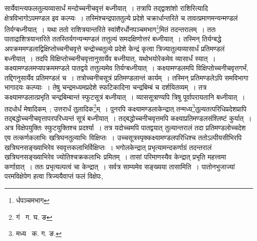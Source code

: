 \documentclass[11pt, openany]{book}
\begin{document}
\noindent सार्येवान्त्यफलतुल्यव्यासार्धं मन्दोच्चनीचवृत्तं बध्नीयात्~। तत्रापि तद्द्वाशांशो राशिरित्यादि क्षेत्रविभागोऽपमण्डल इव 
कल्प्यः~। तस्मिंश्चन्द्रपाततुल्ये प्रदेशे चक्रार्धान्तरिते च तावत्प्रमाणमन्यन्मण्डलं तिर्यग्बध्नीयात्~। यथा ततो 
राशित्रयान्तरिते स्वांशैरर्धोनपञ्चमभाग\renewcommand{\thefootnote}{१}\footnote{र्धपञ्चमभाग}मितं तदन्तरालम्~। ततः 
पाताद्राशित्रयान्तरिते ततस्तिर्यगन्यन्मण्डलं तत्तुल्यं समदक्षिणोत्तरं बध्नीयात्~। तस्मिन् तिर्यग्बद्धे अपक्रममण्डलाद्विक्षिप्तोच्चनीचवृत्ते
चन्द्रोच्चतुल्ये प्रदेशे केन्द्रं कृत्वा त्रिज्यातुल्यव्यासार्धं प्रतिमण्डलं बध्नीयात्~। तदपि विक्षिप्तोच्चनीचवृत्तानुसार्येव बध्नीयात्, 
यथोभयोरेकमेव व्यासार्धं स्यात्~। कक्ष्यामण्डलमप्यपक्रममण्डले पातद्वये तत्तुल्यमेव तिर्यग्बध्नीयात्~। कक्ष्यामण्डलमपि 
विक्षिप्तोच्चनीचवृत्तगर्भं, तद्दिगनुसार्येव प्रतिमण्डलं च~। तत्रोच्चनीचसूत्रं प्रतिमण्डलान्तं कार्यम्~। तस्मिन् प्रतिमण्डलेऽपि समविभागा भागादयः कल्प्याः~। तेषु चन्द्रमध्यमप्रदेशे स्फटिकादिना चन्द्रबिम्बं च दर्शयितव्यम्~। तत्र कक्ष्यामण्डलात्प्रभृति चन्द्रबिम्बान्तं
स्फुटसूत्रं बध्नीयात्~। व्याससूत्राण्यपि त्रिषु पूर्वापरायतानि बध्नीयात्~। तदधोर्धं मेषादिकम्~; उत्तरार्धं तुलादिक\renewcommand{\thefootnote}{२}\footnote{गं \textendash\ ग. घ. ङ}म्~। पुनरपि कक्ष्यामण्डलाकेन्द्रात् 
तन्मध्य\renewcommand{\thefootnote}{३}\footnote{मध्य \textendash\ क. ग. ङ.}तुल्यतत्परिधिप्रदेशप्रापि तद्बद्धोच्चनीचवृत्तापरपरिध्यन्तं सूत्रं बध्नीयात्~। तद्बद्धोच्चनीचवृत्तमपि कक्ष्याप्रतिमण्डलसंश्लिष्टं कुर्यात्~।
अत्र विक्षेपयुक्तिः स्फुटयुक्तिश्च प्रदर्श्या~। तत्र यदोच्चमपि पातद्वयात् तुल्यान्तरालं तदा प्रतिमण्डलोच्चदेश एव तत्कर्णकलाभिः खत्रिघनतुल्याभिः विक्षिप्तः~। उच्चसूत्रस्पृक्कक्ष्यामण्डलपरिधिश्च ततोऽल्पीयसीभिरपि खत्रिघनसङ्ख्याभिरेव स्ववृत्तकलाभिर्विक्षिप्तः~। भगोलकेन्द्रात् प्रभृत्यामन्दकर्णाग्रं तदन्तरालं खत्रिघनसङ्ख्याभिरेव ज्योतिश्चक्रकलाभिः प्रमितम्~। तासां परिमाणस्यैव केन्द्रात् प्रभृति महत्त्वमा कर्णाग्रात्~। ततः प्रभृत्यल्पत्वं चा केन्द्रात्~। सर्वत्र साम्यमेव सङ्ख्यया तासामिति~। पातोनभुजाज्यां परमविक्षेपेण हत्वा त्रिज्ययैवाप्तं फलं विक्षेपः, 


\newpage
\end{document}
